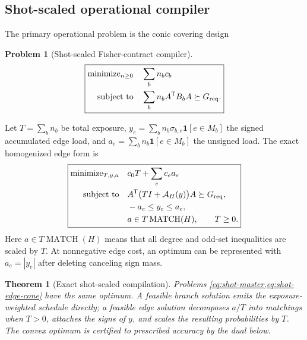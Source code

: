 \documentclass[11pt]{article}
\newtheorem{theorem}{Theorem}[section]
\theoremstyle{definition}
\newtheorem{problem}[problem]{Problem}
\theoremstyle{remark}
\newcommand{\MATCH}{\operatorname{MATCH}}
\begin{document}
\subsection{Shot-scaled operational compiler}
The primary operational problem is the conic covering design
\begin{problem}[Shot-scaled Fisher-contract compiler]
\label{prob:shot-master}
\begin{equation}
\boxed{
\begin{aligned}
  \text{minimize}_{n\ge0}\quad &\sum_b n_bc_b\\
  \text{subject to}\quad &\sum_b n_bA^{\mathsf T}B_bA\succeq G_{\rm req}.
\end{aligned}}
\label{eq:shot-master}
\end{equation}
\end{problem}
Let $T=\sum_bn_b$ be total exposure, $y_e=\sum_bn_b\sigma_{b,e}\mathbf1[e\in M_b]$ the signed accumulated edge load, and $a_e=\sum_bn_b\mathbf1[e\in M_b]$ the unsigned load. The exact homogenized edge form is
\begin{equation}
\boxed{
\begin{aligned}
  \text{minimize}_{T,y,a}\quad &c_0T+\sum_ec_ea_e\\
  \text{subject to}\quad &A^{\mathsf T}\bigl(TI+\mathcal A_H(y)\bigr)A\succeq G_{\rm req},\\
  &-a_e\le y_e\le a_e,\\
  &a\in T\MATCH(H),\qquad T\ge0.
\end{aligned}}
\label{eq:shot-edge-cone}
\end{equation}
Here $a\in T\MATCH(H)$ means that all degree and odd-set inequalities are scaled by $T$. At nonnegative edge cost, an optimum can be represented with $a_e=|y_e|$ after deleting canceling sign mass.

\begin{theorem}[Exact shot-scaled compilation]
\label{thm:shot-compiler}
Problems \cref{eq:shot-master,eq:shot-edge-cone} have the same optimum. A feasible branch solution emits the exposure-weighted schedule directly; a feasible edge solution decomposes $a/T$ into matchings when $T>0$, attaches the signs of $y$, and scales the resulting probabilities by $T$. The convex optimum is certified to prescribed accuracy by the dual below.
\end{theorem}
\end{document}
